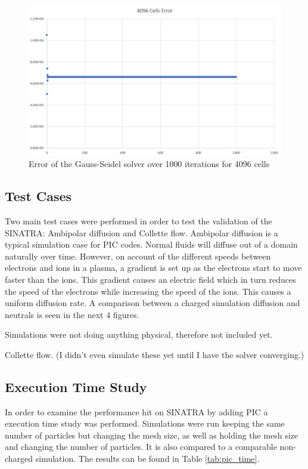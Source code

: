 \begin{figure}
\includegraphics[width=.95\textwidth]{figures/error4096.JPG}
\centering
\caption{Error of the Gauss-Seidel solver over 1000 iterations for 4096 cells}
\label{fig:error4096}
\end{figure}


\subsection{Test Cases}

Two main test cases were performed in order to test the validation of the SINATRA: Ambipolar diffusion and Collette flow. Ambipolar diffusion is a typical simulation case for PIC codes. Normal fluids will diffuse out of a domain naturally over time. However, on account of the different speeds between electrons and ions in a plasma, a gradient is set up as the electrons start to move faster than the ions. This gradient causes an electric field which in turn reduces the speed of the electrons while increasing the speed of the ions. This causes a uniform diffusion rate. A comparison between a charged simulation diffusion and neutrals is seen in the next 4 figures. \par

Simulations were not doing anything physical, therefore not included yet. 

\indent Collette flow. (I didn't even simulate these yet until I have the solver converging.)


\subsection{Execution Time Study}

In order to examine the performance hit on SINATRA by adding PIC a execution time study was performed. Simulations were run keeping the same number of particles but changing the mesh size, as well as holding the mesh size and changing the number of particles. It is also compared to a comparable non-charged simulation. The results can be found in Table \ref{tab:pic_time}.

